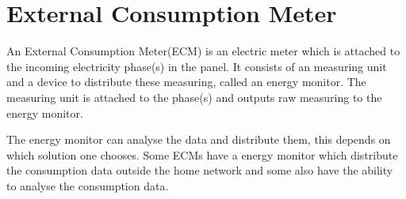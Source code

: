 \section{External Consumption Meter}
An External Consumption Meter(ECM) is an electric meter which is attached to the incoming electricity phase(s) in the panel.
It consists of an measuring unit and a device to distribute these measuring, called an energy monitor.
The measuring unit is attached to the phase(s) and outputs raw measuring to the energy monitor.

The energy monitor can analyse the data and distribute them, this depends on which solution one chooses.
Some ECMs have a energy monitor which distribute the consumption data outside the home network and some also have the ability to analyse the consumption data.\cite{TED}\cite{efergy}\cite{open_energy_monitor}
